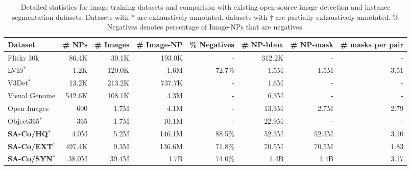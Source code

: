 \documentclass[]{fairmeta}
\newcommand{\myappendixtablebaselineskip}{9.5}
\newcommand{\dsname}{{SA-Co}\xspace}
\newcommand{\trainhq}{{\dsname/HQ}\xspace}
\newcommand{\trainsyn}{{\dsname/SYN}\xspace}
\newcommand{\trainext}{{\dsname/EXT}\xspace}
\begin{document}
\begin{table}[h]
	\centering
	{\footnotesize
		{\fontsize{7.8}{\myappendixtablebaselineskip}\selectfont
			\begin{NiceTabular}{lrrrrrrr}
				\CodeBefore
				\Body
				\textbf{Dataset} & \# NPs & \# Images & \# Image-NP & \% Negatives & \# NP-bbox  & \# NP-mask & \# masks per pair \\
				\midrule
				Flickr 30k & 86.4K & 30.1K & 193.0K & - & 312.2K & - & - \\
				LVIS$^{*}$ & 1.2K & 120.0K & 1.6M & 72.7\% & 1.5M & 1.5M & 3.51 \\
				V3Det$^{*}$ & 13.2K & 213.2K & 737.7K & - & 1.6M & - & - \\
				Visual Genome & 542.6K & 108.1K & 4.3M & - & 6.3M & - & - \\
				Open Images & 600 & 1.7M & 4.1M & - & 13.3M & 2.7M & 2.79 \\
				Object365$^{*}$ & 365 & 1.7M & 10.1M & - & 22.9M & - & - \\
				\midrule
				\textbf{\trainhq}$^{*}$ & 4.0M & 5.2M & 146.1M & 88.5\% & 52.3M & 52.3M & 3.10 \\
				\textbf{\trainext}$^{\dagger}$ & 497.4K & 9.3M & 136.6M & 71.8\% & 70.5M & 70.5M & 1.83 \\
				\textbf{\trainsyn}$^{*}$ & 38.0M & 39.4M & 1.7B & 74.0\% & 1.4B & 1.4B & 3.17 \\
			\end{NiceTabular}  
		}
	}
	\caption{Detailed statistics for image training datasets and comparison with existing open-source image detection and instance segmentation datasets. Datasets with $*$ are exhaustively annotated, datasets with $\dagger$ are partially exhaustively annotated. \% Negatives denotes percentage of Image-NPs that are negatives.}   
	\label{tab:sac_train_img_data_stats}
\end{table}
\end{document}
